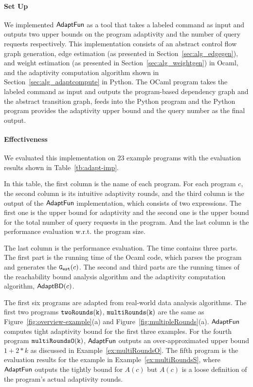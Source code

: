 
\paragraph{Set Up}
We implemented $\textsf{AdaptFun}$ as a tool that takes a labeled command as input 
and outputs two upper bounds on the program adaptivity and the number of query requests respectively.
This implementation consists of an 
abstract control flow graph generation,
edge estimation (as presented in Section~\ref{sec:alg_edgegen}), and weight estimation (as presented in Section~\ref{sec:alg_weightgen}) in Ocaml, 
and the adaptivity computation algorithm shown in Section~\ref{sec:alg_adaptcompute} in Python.
The OCaml program takes the labeled command as input and outputs the program-based dependency graph and
the abstract transition graph,
feeds into the Python program and the Python program provides the adaptivity upper bound and the query number as the final output.


\paragraph{Effectiveness}

We evaluated this implementation on $23$ example programs with the evaluation results shown in Table~\ref{tb:adapt-imp}.

In this table,
the first column is the name of each program.
For each program $c$, the second column is its intuitive adaptivity rounds,
and the third column is the output of the $\textsf{AdaptFun}$ implementation, which consists of two expressions.
The first one is the upper bound for adaptivity and the second one is the 
upper bound for the total number of query requests in the program. And the last column is the performance evaluation w.r.t. the program size.

The last column is the performance evaluation.
The time contains three parts. The first part is the running time of the Ocaml code, which parses the program and generates the $\mathtt{{G_{est}}}(c)$.
The second and third parts are the running times of the reachability bound analysis algorithm
and the adaptivity computation algorithm, $\mathsf{AdaptBD}(c)$.

The first six programs are adapted from real-world data analysis algorithms.
The first two programs $\mathtt{twoRounds(k)}$, $ \mathtt{multiRounds(k)}$ are the same as Figure~\ref{fig:overview-example}(a) and Figure~\ref{fig:multipleRounds}(a).
$\textsf{AdaptFun}$ computes tight adaptivity bound for the first three examples.
For the fourth program $\mathtt{multiRoundsO(k)}$, $\textsf{AdaptFun}$ outputs an over-approximated upper bound $1 + 2*k$ 
as discussed in Example~\ref{ex:multiRoundsO}. 
The fifth program is the evaluation results for the example in Example~\ref{ex:multiRoundsS}, where $\textsf{AdaptFun}$ outputs the tightly bound for $A(c)$ but $A(c)$ is a loose definition of the program's actual adaptivity rounds.
%

